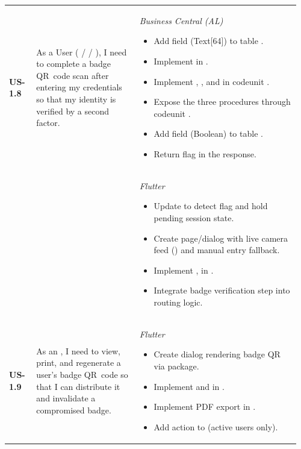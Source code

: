 \begin{longtable}{@{} P{0.09\linewidth} P{0.34\linewidth} P{0.53\linewidth} @{}}
	\textbf{US-1.8}
	& As a User ( /  / ),
	I need to complete a badge QR~code scan after entering my credentials so that
	my identity is verified by a second factor.
	& \noindent\textit{Business Central (AL)}
	\begin{itemize}[nosep, leftmargin=*]
		\item Add field  (Text[64]) to table .
		\item Implement  in .
		\item Implement , , and  in codeunit .
		\item Expose the three procedures through codeunit .
		\item Add field  (Boolean) to table .
		\item Return  flag in the  response.
	\end{itemize}
\\ & &
	\noindent\textit{Flutter}
	\begin{itemize}[nosep, leftmargin=*]
		\item Update  to detect  flag and hold pending session state.
		\item Create page/dialog  with live camera feed () and manual entry fallback.
		\item Implement ,  in .
		\item Integrate badge verification step into  routing logic.
	\end{itemize}\\
	\midrule

	\textbf{US-1.9}
	& As an , I need to view, print, and regenerate a
	user's badge QR~code so that I can distribute it and invalidate a compromised badge.
	& \noindent\textit{Flutter}
	\begin{itemize}[nosep, leftmargin=*]
		\item Create dialog  rendering badge QR via  package.
		\item Implement  and  in .
		\item Implement PDF export in .
		\item Add  action to  (active users only).
	\end{itemize}\\
	\midrule


\end{longtable}
